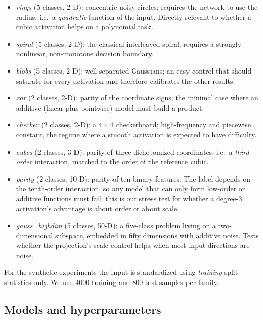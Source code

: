 \begin{itemize}
\item \emph{rings} (5 classes, 2-D): concentric noisy circles; requires the
  network to use the radius, i.e.\ a \emph{quadratic} function of the input.
  Directly relevant to whether a cubic activation helps on a polynomial task.
\item \emph{spiral} (5 classes, 2-D): the classical interleaved spiral;
  requires a strongly nonlinear, non-monotone decision boundary.
\item \emph{blobs} (5 classes, 2-D): well-separated Gaussians; an easy control
  that should saturate for every activation and therefore calibrates the other
  results.
\item \emph{xor} (2 classes, 2-D): parity of the coordinate signs; the minimal
  case where an additive (linear-plus-pointwise) model must build a product.
\item \emph{checker} (2 classes, 2-D): a $4\times4$ checkerboard; high-frequency
  and piecewise constant, the regime where a smooth activation is expected to
  have difficulty.
\item \emph{cubes} (2 classes, 3-D): parity of three dichotomized coordinates,
  i.e.\ a \emph{third-order} interaction, matched to the order of the reference
  cubic.
\item \emph{parity} (2 classes, 10-D): parity of ten binary features. The label
  depends on the tenth-order interaction, so any model that can only form
  low-order or additive functions must fail; this is our stress test for
  whether a degree-3 activation's advantage is about order or about scale.
\item \emph{gauss\_highdim} (5 classes, 50-D): a five-class problem living on a
  two-dimensional subspace, embedded in fifty dimensions with additive noise.
  Tests whether the projection's scale control helps when most input
  directions are noise.
\end{itemize}

For the synthetic experiments the input is standardized using \emph{training}
split statistics only. We use $4000$ training and $800$ test samples per
family.

\subsection{Models and hyperparameters}

